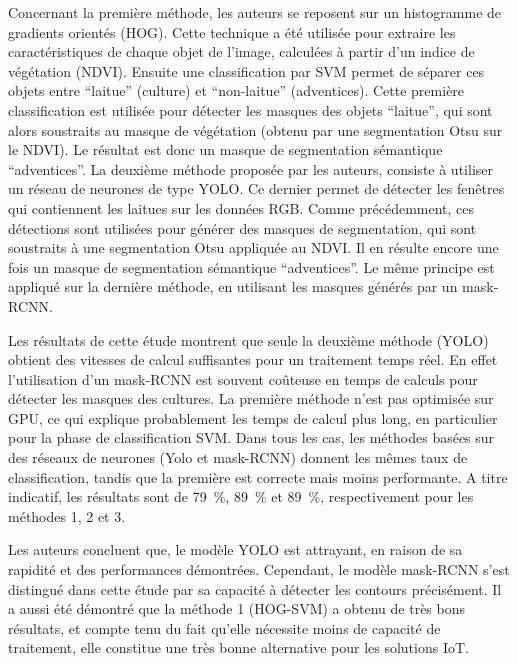 \documentclass[../thesis.tex]{subfiles}
\begin{document}
    Concernant la première méthode, les auteurs se reposent sur un histogramme de gradients orientés (HOG). Cette technique a été utilisée   pour extraire les caractéristiques de chaque objet de l'image, calculées à partir d'un indice de végétation (NDVI). Ensuite une classification par SVM permet de séparer ces objets entre ``laitue'' (culture) et ``non-laitue'' (adventices). Cette première classification est utilisée pour détecter les masques des objets ``laitue'', qui sont alors soustraits au masque de végétation (obtenu par une segmentation Otsu sur le NDVI). Le résultat est donc un masque de segmentation sémantique ``adventices''. La deuxième méthode proposée par les auteurs, consiste à utiliser un réseau de neurones de type YOLO. Ce dernier permet de détecter les fenêtres qui contiennent les laitues sur les données RGB. Comme précédemment, ces détections sont utilisées pour générer des masques de segmentation, qui sont soustraits à une segmentation Otsu appliquée au NDVI. Il en résulte encore une fois un masque de segmentation sémantique ``adventices''. Le même principe est appliqué sur la dernière méthode, en utilisant les masques générés par un mask-RCNN.
    
    Les résultats de cette étude montrent que seule la deuxième méthode (YOLO) obtient des vitesses de calcul suffisantes pour un traitement temps réel. En effet l'utilisation d'un mask-RCNN est souvent coûteuse en temps de calculs pour détecter les masques des cultures. La première méthode n'est pas optimisée sur GPU, ce qui explique probablement les temps de calcul plus long, en particulier pour la phase de classification SVM. Dans tous les cas, les méthodes basées sur des réseaux de neurones (Yolo et mask-RCNN) donnent les mêmes taux de classification, tandis que la première est correcte mais moins performante. A titre indicatif, les résultats sont de \SI{79}{\percent}, \SI{89}{\percent} et \SI{89}{\percent}, respectivement pour les méthodes 1, 2 et 3.
    
    Les auteurs concluent que, le modèle YOLO est attrayant, en raison de sa rapidité et des performances démontrées. Cependant, le modèle mask-RCNN s'est distingué dans cette étude par sa capacité à détecter les contours précisément. Il a aussi été démontré que la méthode 1 (HOG-SVM) a obtenu de très bons résultats, et compte tenu du fait qu'elle nécessite moins de capacité de traitement, elle constitue une très bonne alternative pour les solutions IoT.
    
    
    
\end{document}
